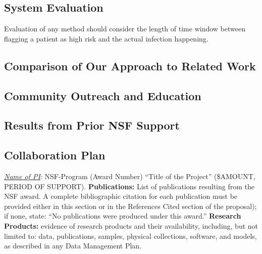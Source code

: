 \subsection{System Evaluation}
Evaluation of any method should consider the length of time window between flagging a patient as high risk and the actual infection happening.

\subsection{Comparison of Our Approach to Related Work}

\subsection{Community Outreach and Education}

\subsection{Results from Prior NSF Support}

\subsection{Collaboration Plan}

\noindent
\emph{\underline{Name of PI}}: NSF-Program (Award Number) ``Title of the Project'' (\$AMOUNT, PERIOD OF SUPPORT).
{\bf Publications:} List of publications resulting from the NSF award. A complete bibliographic citation for each
publication must be provided either in this section or in the References Cited section of the proposal); if
none, state: ``No publications were produced under this award.'' {\bf Research Products:} evidence of research products
and their availability, including, but not limited to: data, publications, samples, physical collections, software,
and models, as described in any Data Management Plan.
